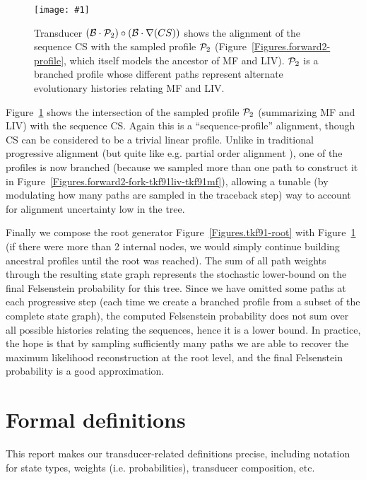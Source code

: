 \documentclass{article}
\newcommand{\figref}[1]{Figure~\ref{Figures.#1}}
\newcommand{\figlabel}[1]{\label{Figures.#1}}
\newcommand{\easyfig}[4]{
\begin{figure}
\texttt{[image: \#1]}
\caption{ \figlabel{#3} #4}
\end{figure}}
\newcommand{\widepngfig}[2]{\easyfig{#1.png}{width=\textwidth}{#1}{#2}}
\newcommand{\needfig}[1]{{\bf Need figure: } #1 }
\newcommand\tkf{{\cal B}}
\newcommand\profile{{\cal P}}
\newcommand\fork{\circ}
\newcommand\recognize{\nabla}
\begin{document}
\widepngfig{fork-tkf91forward2-tkf91cs}{Transducer $(\tkf \cdot \profile_2)\fork(\tkf \cdot \recognize(CS))$ shows the alignment of the sequence CS with the sampled profile $\profile_2$ 
(\figref{forward2-profile}, which itself models the ancestor of MF and LIV).
$\profile_2$ is a branched profile whose different paths represent alternate evolutionary
histories relating MF and LIV. }

\figref{fork-tkf91forward2-tkf91cs} shows the intersection of the sampled profile $\profile_2$ (summarizing MF and LIV) with the sequence CS.  
 Again this is a ``sequence-profile'' alignment, though CS can be considered to be a 
trivial linear profile.  
Unlike in traditional progressive alignment
 (but quite like e.g. partial order alignment \cite{LeeGrassoSharlow2002}),
one of the profiles is now branched
 (because we sampled more than one path to construct it in \figref{forward2-fork-tkf91liv-tkf91mf}), allowing a tunable (by modulating how many paths are sampled in the traceback step)
way to account for alignment uncertainty low in the tree.  


Finally we compose the root generator \figref{tkf91-root}
with \figref{fork-tkf91forward2-tkf91cs} (if there were more than 2 internal nodes,
we would simply continue building ancestral profiles until the root was reached).
The sum of all path weights through the resulting state graph
 represents the stochastic lower-bound
on the final Felsenstein probability for this tree.
Since we have omitted some paths at each progressive step
 (each time we create a branched profile from a subset of the complete state graph),
the computed Felsenstein probability does not sum over all possible histories
relating the sequences, hence it is a lower bound.  
In practice, the hope is that by sampling sufficiently many paths we are able to 
recover the maximum likelihood reconstruction at the root level, and the
final Felsenstein probability is a good approximation. 



\pagebreak
\section{Formal definitions}
This report makes our transducer-related definitions precise,
 including notation for state types, weights (i.e. probabilities),
 transducer composition, etc.
\end{document}
